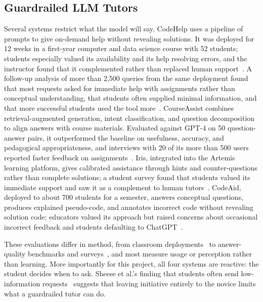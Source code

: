 \documentclass[manuscript,review]{acmart}
\begin{document}
\subsection{Guardrailed LLM Tutors}
Several systems restrict what the model will say. CodeHelp uses a pipeline of prompts to give on-demand help without revealing solutions. It was deployed for 12 weeks in a first-year computer and data science course with 52 students; students especially valued its availability and its help resolving errors, and the instructor found that it complemented rather than replaced human support~\cite{liffiton2023codehelp}. A follow-up analysis of more than 2,500 queries from the same deployment found that most requests asked for immediate help with assignments rather than conceptual understanding, that students often supplied minimal information, and that more successful students used the tool more~\cite{sheese2024patterns}. CourseAssist combines retrieval-augmented generation, intent classification, and question decomposition to align answers with course materials. Evaluated against GPT-4 on 50 question-answer pairs, it outperformed the baseline on usefulness, accuracy, and pedagogical appropriateness, and interviews with 20 of its more than 500 users reported faster feedback on assignments~\cite{feng2024courseassist}. Iris, integrated into the Artemis learning platform, gives calibrated assistance through hints and counter-questions rather than complete solutions; a student survey found that students valued its immediate support and saw it as a complement to human tutors~\cite{bassner2024iris}. CodeAid, deployed to about 700 students for a semester, answers conceptual questions, produces explained pseudo-code, and annotates incorrect code without revealing solution code; educators valued its approach but raised concerns about occasional incorrect feedback and students defaulting to ChatGPT~\cite{kazemitabaar2024codeaid}.

These evaluations differ in method, from classroom deployments~\cite{liffiton2023codehelp,kazemitabaar2024codeaid} to answer-quality benchmarks and surveys~\cite{feng2024courseassist,bassner2024iris}, and most measure usage or perception rather than learning. More importantly for this project, all four systems are reactive: the student decides when to ask. Sheese et al.'s finding that students often send low-information requests~\cite{sheese2024patterns} suggests that leaving initiative entirely to the novice limits what a guardrailed tutor can do.
\end{document}
